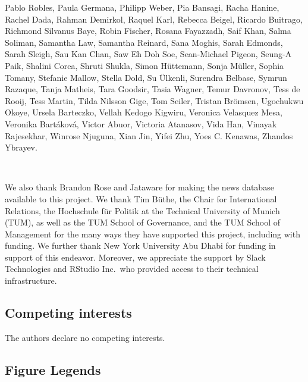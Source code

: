 \documentclass[]{article}
\begin{document}
Pablo Robles, Paula Germana, Philipp Weber, Pia Bansagi, Racha Hanine, Rachel Dada, Rahman Demirkol, Raquel Karl, Rebecca Beigel, Ricardo Buitrago, Richmond Silvanus Baye, Robin Fischer, Rosana Fayazzadh, Saif Khan, Salma Soliman, Samantha Law, Samantha Reinard, Sana Moghis, Sarah Edmonds, Sarah Sleigh, Sau Kan Chan, Saw Eh Doh Soe, Sean-Michael Pigeon, Seung-A Paik, Shalini Corea, Shruti Shukla, Simon Hüttemann, Sonja Müller, Sophia Tomany, Stefanie Mallow, Stella Dold, Su Ülkenli, Surendra Belbase, Symrun Razaque, Tanja Matheis, Tara Goodsir, Tasia Wagner, Temur Davronov, Tess de Rooij, Tess Martin, Tilda Nilsson Gige, Tom Seiler, Tristan Brömsen, Ugochukwu Okoye, Ursela Barteczko, Vellah Kedogo Kigwiru, Veronica Velasquez Mesa, Veronika Bartáková, Victor Abuor, Victoria Atanasov, Vida Han, Vinayak Rajesekhar, Winrose Njuguna, Xian Jin, Yifei Zhu, Yoes C. Kenawas, Zhandos Ybrayev.

~
~

We also thank Brandon Rose and Jataware for making the news database available to this project. We thank Tim Büthe, the Chair for International Relations, the Hochschule für Politik at the Technical University of Munich (TUM), as well as the TUM School of Governance, and the TUM School of Management for the many ways they have supported this project, including with funding. We further thank New York University Abu Dhabi for funding in support of this endeavor. Moreover, we appreciate the support by Slack Technologies and RStudio Inc.~who provided access to their technical infrastructure.

\hypertarget{competing-interests}{%
\subsection*{Competing interests}\label{competing-interests}}

The authors declare no competing interests.

\hypertarget{figure-legends}{%
\subsection*{Figure Legends}\label{figure-legends}}
\end{document}
